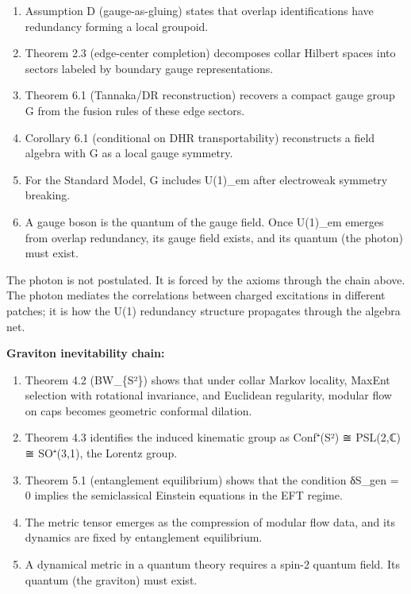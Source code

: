 \documentclass[
]{article}
\providecommand{\tightlist}{%
  \setlength{\itemsep}{0pt}\setlength{\parskip}{0pt}}
\begin{document}
\begin{enumerate}
\def\labelenumi{\arabic{enumi}.}
\tightlist
\item
  Assumption D (gauge-as-gluing) states that overlap identifications
  have redundancy forming a local groupoid.
\item
  Theorem 2.3 (edge-center completion) decomposes collar Hilbert spaces
  into sectors labeled by boundary gauge representations.
\item
  Theorem 6.1 (Tannaka/DR reconstruction) recovers a compact gauge group
  G from the fusion rules of these edge sectors.
\item
  Corollary 6.1 (conditional on DHR transportability) reconstructs a
  field algebra with G as a local gauge symmetry.
\item
  For the Standard Model, G includes U(1)\_em after electroweak symmetry
  breaking.
\item
  A gauge boson is the quantum of the gauge field. Once U(1)\_em emerges
  from overlap redundancy, its gauge field exists, and its quantum (the
  photon) must exist.
\end{enumerate}

The photon is not postulated. It is forced by the axioms through the
chain above. The photon mediates the correlations between charged
excitations in different patches; it is how the U(1) redundancy
structure propagates through the algebra net.

\textbf{Graviton inevitability chain:}

\begin{enumerate}
\def\labelenumi{\arabic{enumi}.}
\tightlist
\item
  Theorem 4.2 (BW\_\{S²\}) shows that under collar Markov locality,
  MaxEnt selection with rotational invariance, and Euclidean regularity,
  modular flow on caps becomes geometric conformal dilation.
\item
  Theorem 4.3 identifies the induced kinematic group as Conf⁺(S²) ≅
  PSL(2,ℂ) ≅ SO⁺(3,1), the Lorentz group.
\item
  Theorem 5.1 (entanglement equilibrium) shows that the condition
  δS\_gen = 0 implies the semiclassical Einstein equations in the EFT
  regime.
\item
  The metric tensor emerges as the compression of modular flow data, and
  its dynamics are fixed by entanglement equilibrium.
\item
  A dynamical metric in a quantum theory requires a spin-2 quantum
  field. Its quantum (the graviton) must exist.
\end{enumerate}
\end{document}
